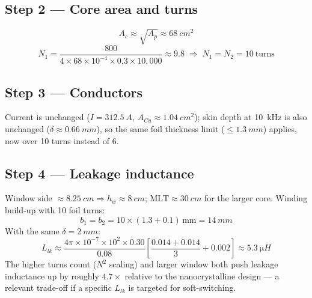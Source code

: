 \documentclass[11pt,a4paper]{article}
\begin{document}
\subsection*{Step 2 — Core area and turns}
\begin{equation}
    A_c \approx \sqrt{A_p} \approx \SI{68}{cm^2}
\end{equation}
\begin{equation}
    N_1 = \frac{800}{4\times68\times10^{-4}\times0.3\times10{,}000}
    \approx 9.8 \;\Rightarrow\; N_1=N_2=10 \ \text{turns}
\end{equation}

\subsection*{Step 3 — Conductors}
Current is unchanged ($I=\SI{312.5}{A}$, $A_{Cu}\approx\SI{1.04}{cm^2}$); skin
depth at \SI{10}{kHz} is also unchanged ($\delta\approx\SI{0.66}{mm}$), so the
same foil thickness limit ($\le\SI{1.3}{mm}$) applies, now over 10 turns instead
of 6.

\subsection*{Step 4 — Leakage inductance}
Window side $\approx\SI{8.25}{cm}\Rightarrow h_w\approx\SI{8}{cm}$;
$\mathrm{MLT}\approx\SI{30}{cm}$ for the larger core. Winding build-up with 10
foil turns:
\begin{equation}
    b_1=b_2=10\times(1.3+0.1)\,\text{mm}=\SI{14}{mm}
\end{equation}
With the same $\delta=\SI{2}{mm}$:
\begin{equation}
    L_{lk} \approx \frac{4\pi\times10^{-7}\times10^2\times0.30}{0.08}
    \left[\frac{0.014+0.014}{3}+0.002\right] \approx \SI{5.3}{\micro H}
\end{equation}
The higher turns count ($N^2$ scaling) and larger window both push leakage
inductance up by roughly $4.7\times$ relative to the nanocrystalline design —
a relevant trade-off if a specific $L_{lk}$ is targeted for soft-switching.
\end{document}
